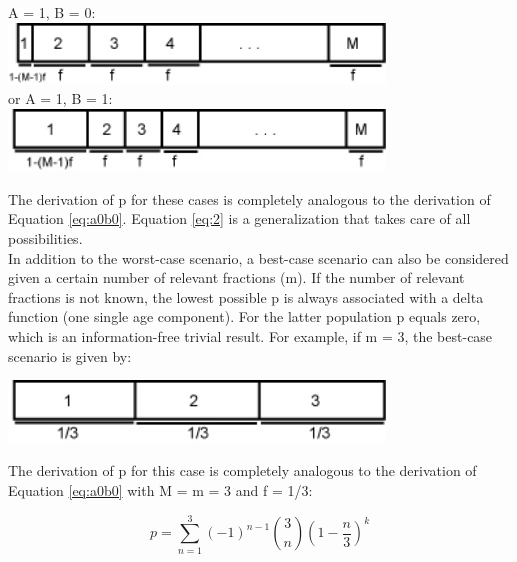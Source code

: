 \documentclass[12]{article}
\begin{document}
  \begin{center}
  A = 1, B = 0:\\ 
  \includegraphics[width=10cm]{A10.jpg}\\  
  or  A = 1, B  = 1:\\ 
  \includegraphics[width=10cm]{A11.jpg}
  \end{center}

The derivation  of p  for these cases  is completely analogous  to the
derivation of Equation \ref{eq:a0b0}.  Equation \ref{eq:2}
is a generalization that takes care of all possibilities.\\

\noindent In addition to the worst-case  scenario, a best-case scenario can also
be considered  given a certain  number of relevant fractions  (m).  If
the number of  relevant fractions is not known,  the lowest possible p
is always associated with a delta function (one single age component).
For the latter population p  equals zero, which is an information-free
trivial  result.  For example,  if m  = 3,  the best-case  scenario is
given by:


\begin{minipage}[c]{\textwidth}

  \begin{center}
  \includegraphics[width=10cm]{A12.jpg}\\  
  \end{center}

The derivation  of p  for this case  is completely analogous  to the
derivation of Equation \ref{eq:a0b0} with M = m = 3 and f = 1/3:

\begin{equation}
\label{eq:best_case}
p  =  \sum_{n=1}^{3}(-1)^{n-1} \binom{3}{n}\left(1-\frac{n}{3}\right)^k
\end{equation}

\end{minipage}
\end{document}
